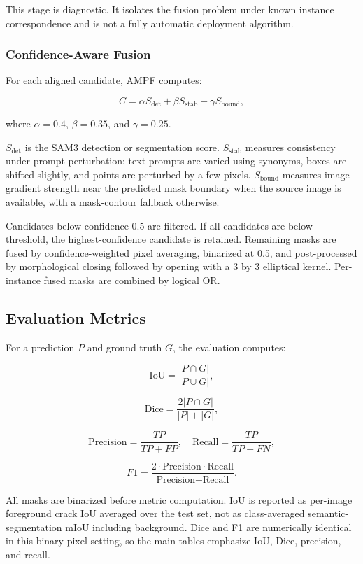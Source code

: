 \documentclass[applsci,article,submit,pdftex,moreauthors]{Definitions/mdpi}
\begin{document}
This stage is diagnostic. It isolates the fusion problem under known
instance correspondence and is not a fully automatic deployment
algorithm.

\subsubsection{Confidence-Aware Fusion}

For each aligned candidate, AMPF computes:

\[
C = \alpha S_{\text{det}} + \beta S_{\text{stab}} + \gamma S_{\text{bound}},
\]

where \(\alpha = 0.4\), \(\beta = 0.35\), and \(\gamma = 0.25\).

\(S_{\text{det}}\) is the SAM3 detection or segmentation score.
\(S_{\text{stab}}\) measures consistency under prompt perturbation: text
prompts are varied using synonyms, boxes are shifted slightly, and
points are perturbed by a few pixels. \(S_{\text{bound}}\) measures
image-gradient strength near the predicted mask boundary when the source
image is available, with a mask-contour fallback otherwise.

Candidates below confidence 0.5 are filtered. If all candidates are
below threshold, the highest-confidence candidate is retained. Remaining
masks are fused by confidence-weighted pixel averaging, binarized at
0.5, and post-processed by morphological closing followed by opening
with a 3 by 3 elliptical kernel. Per-instance fused masks are combined
by logical OR.

\subsection{Evaluation Metrics}

For a prediction \(P\) and ground truth \(G\), the evaluation computes:

\[
\text{IoU} = \frac{|P \cap G|}{|P \cup G|},
\]

\[
\text{Dice} = \frac{2|P \cap G|}{|P| + |G|},
\]

\[
\text{Precision} = \frac{TP}{TP + FP}, \quad
\text{Recall} = \frac{TP}{TP + FN},
\]

\[
F1 = \frac{2 \cdot \text{Precision} \cdot \text{Recall}}{\text{Precision} + \text{Recall}}.
\]

All masks are binarized before metric computation. IoU is reported as
per-image foreground crack IoU averaged over the test set, not as
class-averaged semantic-segmentation mIoU including background. Dice and
F1 are numerically identical in this binary pixel setting, so the main
tables emphasize IoU, Dice, precision, and recall.
\end{document}
